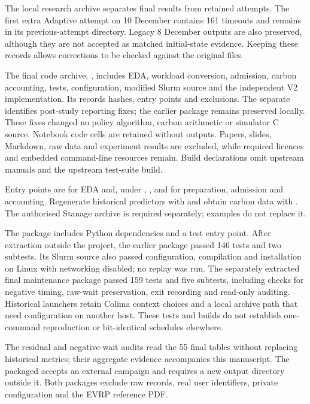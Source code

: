 The local research archive separates final results from retained attempts. The first extra Adaptive attempt on 10 December contains 161 timeouts and remains in its previous-attempt directory. Legacy 8 December outputs are also preserved, although they are not accepted as matched initial-state evidence. Keeping these records allows corrections to be checked against the original files.

The final code archive, , includes EDA, workload conversion, admission, carbon accounting, tests, configuration, modified Slurm source and the independent V2 implementation. Its  records hashes, entry points and exclusions. The separate  identifies post-study reporting fixes; the earlier package remains preserved locally. These fixes changed no policy algorithm, carbon arithmetic or simulator C source. Notebook code cells are retained without outputs. Papers, slides, Markdown, raw data and experiment results are excluded, while required licences and embedded command-line resources remain. Build declarations omit upstream manuals and the upstream test-suite build.

Entry points are  for EDA and, under , ,  and  for preparation, admission and accounting. Regenerate historical predictors with  and obtain carbon data with . The authorised Stanage archive is required separately; examples do not replace it.

The package includes Python dependencies and a test entry point. After extraction outside the project, the earlier package passed 146 tests and two subtests. Its Slurm source also passed configuration, compilation and installation on Linux with networking disabled; no replay was run. The separately extracted final maintenance package passed 159 tests and five subtests, including checks for negative timing, raw-wait preservation, exit recording and read-only auditing. Historical launchers retain Colima context choices and a local archive path that need configuration on another host. These tests and builds do not establish one-command reproduction or bit-identical schedules elsewhere.

The residual and negative-wait audits read the 55 final tables without replacing historical metrics; their aggregate evidence accompanies this manuscript. The packaged  accepts an external campaign and requires a new output directory outside it. Both packages exclude raw records, real user identifiers, private configuration and the EVRP reference PDF.

